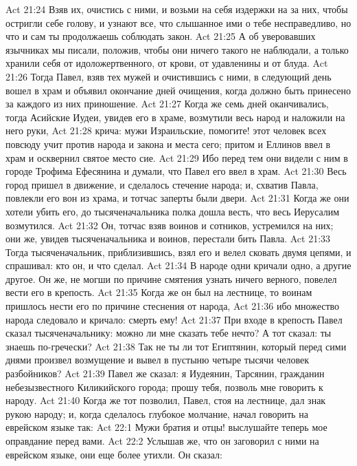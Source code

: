 \vs Act 21:24 Взяв их, очистись с ними, и возьми на себя издержки на  за них, чтобы остригли себе голову, и узнают все, что слышанное ими о тебе несправедливо, но что и сам ты продолжаешь соблюдать закон.
\vs Act 21:25 А об уверовавших язычниках мы писали, положив, чтобы они ничего такого не наблюдали, а только хранили себя от идоложертвенного, от крови, от удавленины и от блуда.
\vs Act 21:26 Тогда Павел, взяв тех мужей и очистившись с ними, в следующий день вошел в храм и объявил окончание дней очищения, когда должно быть принесено за каждого из них приношение.
\rsbpar\vs Act 21:27 Когда же семь дней оканчивались, тогда Асийские Иудеи, увидев его в храме, возмутили весь народ и наложили на него руки,
\vs Act 21:28 крича: мужи Израильские, помогите! этот человек всех повсюду учит против народа и закона и места сего; притом и Еллинов ввел в храм и осквернил святое место сие.
\vs Act 21:29 Ибо перед тем они видели с ним в городе Трофима Ефесянина и думали, что Павел его ввел в храм.
\vs Act 21:30 Весь город пришел в движение, и сделалось стечение народа; и, схватив Павла, повлекли его вон из храма, и тотчас заперты были двери.
\vs Act 21:31 Когда же они хотели убить его, до тысяченачальника полка дошла весть, что весь Иерусалим возмутился.
\vs Act 21:32 Он, тотчас взяв воинов и сотников, устремился на них; они же, увидев тысяченачальника и воинов, перестали бить Павла.
\vs Act 21:33 Тогда тысяченачальник, приблизившись, взял его и велел сковать двумя цепями, и спрашивал: кто он, и что сделал.
\vs Act 21:34 В народе одни кричали одно, а другие другое. Он же, не могши по причине смятения узнать ничего верного, повелел вести его в крепость.
\vs Act 21:35 Когда же он был на лестнице, то воинам пришлось нести его по причине стеснения от народа,
\vs Act 21:36 ибо множество народа следовало и кричало: смерть ему!
\rsbpar\vs Act 21:37 При входе в крепость Павел сказал тысяченачальнику: можно ли мне сказать тебе нечто? А тот сказал: ты знаешь по-гречески?
\vs Act 21:38 Так не ты ли тот Египтянин, который перед сими днями произвел возмущение и вывел в пустыню четыре тысячи человек разбойников?
\vs Act 21:39 Павел же сказал: я Иудеянин, Тарсянин, гражданин небезызвестного Киликийского города; прошу тебя, позволь мне говорить к народу.
\vs Act 21:40 Когда же тот позволил, Павел, стоя на лестнице, дал знак рукою народу; и, когда сделалось глубокое молчание, начал говорить на еврейском языке так:
\vs Act 22:1 Мужи братия и отцы! выслушайте теперь мое оправдание перед вами.
\vs Act 22:2 Услышав же, что он заговорил с ними на еврейском языке, они еще более утихли. Он сказал:
